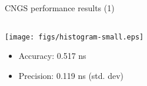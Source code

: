 \documentclass[compress,red]{beamer}
\begin{document}
\begin{frame}{CNGS performance results (1)}

  \begin{columns}[c]
	  \begin{center}

		\hspace{-1cm}
		\texttt{[image: figs/histogram-small.eps]}
		\begin{itemize}
			\item Accuracy: 0.517 ns
			\item Precision: 0.119 ns (std. dev)
		\end{itemize}			



\end{center}
\end{columns}
\end{frame}
\end{document}
